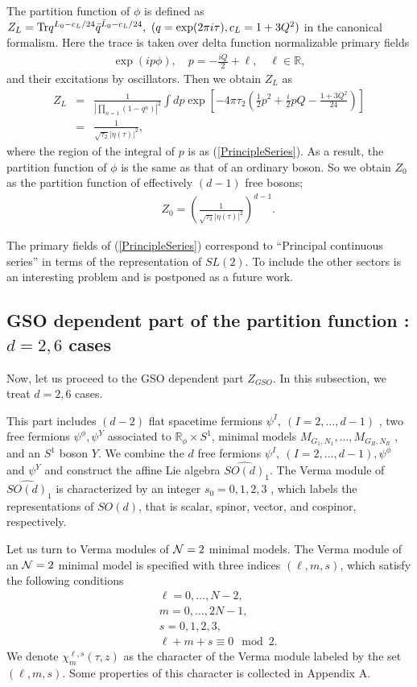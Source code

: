 \documentclass[a4paper,12pt]{article}
\numberwithin{equation}{section}
\newcommand{\Ncal}{{\cal N}}
\newcommand{\Rb}{{\mathbb R}}
\newcommand{\nn}{\nonumber}
\newcommand{\Tr}{{\rm Tr}}
\begin{document}
The partition function of $\phi$ is defined as
$Z_L=\Tr q^{L_0-c_L/24}\bar q^{\bar L_0-c_L/24},
\ (q=\exp(2\pi i\tau),c_L=1+3Q^2)$ in the canonical formalism.
Here the trace is taken over delta function normalizable
primary fields
\begin{eqnarray}
 \exp(ip\phi), \quad p=-\frac{iQ}{2}+\ell, \quad \ell\in \Rb,
\label{PrincipleSeries}
\end{eqnarray}
and their excitations by oscillators. 
Then we obtain $Z_L$ as
\begin{eqnarray*}
 Z_{L}&=&\frac{1}{|\prod_{n=1}(1-q^n)|^2}\int dp
\exp\left[-4\pi\tau_2\left(\frac12 p^2+\frac i2 pQ-\frac{1+3Q^2}{24}\right)
\right]\\
&=& \frac{1}{\sqrt{\tau_2}|\eta(\tau)|^2},
\end{eqnarray*}
where the region of the integral of $p$ is as 
(\ref{PrincipleSeries}).
As a result, the partition function of $\phi$ is the same as that
of an ordinary boson. So we obtain $Z_0$ as the
partition function of effectively $(d-1)$ free bosons;
\begin{eqnarray*}
 && Z_0=\left(\frac{1}{\sqrt{\tau_2}|\eta(\tau)|^2}\right)^{d-1}.
\end{eqnarray*}

The primary fields of (\ref{PrincipleSeries})
correspond to ``Principal continuous series'' in terms 
of the representation
of $SL(2)$. To include the other sectors is an interesting problem
and is postponed as a future work.

\subsection{GSO dependent part of the partition function
: $d=2,6$ cases}

Now, let us proceed to the GSO dependent part $Z_{GSO}$. 
In this subsection, we treat $d=2,6$ cases.

This part includes $(d-2)$ flat 
spacetime fermions $\psi^{I},\ (I=2,\dots,d-1)$ 
, two free fermions $\psi^{\phi},\psi^{Y}$
associated to $\Rb_{\phi}\times S^1$, minimal models
$M_{G_1,N_1},\dots,M_{G_R,N_R}$ , and an $S^1$ boson $Y$. 
We combine the 
$d$ free fermions $\psi^{I},\ (I=2,\dots,d-1) ,\psi^{\phi}$ and 
$\psi^{Y}$
and construct the affine Lie algebra $\widehat{SO(d)}_{1}$. 
The Verma module of $\widehat{SO(d)}_{1}$
is characterized by an integer $s_0=0,1,2,3$ , which labels
the representations of $SO(d)$, that is scalar, spinor, vector, and cospinor,
respectively.

Let us turn to Verma modules of $\Ncal=2$ minimal models.
The Verma module of an $\Ncal=2$ minimal model
is specified with three indices $(\ell,m,s)$, which satisfy
the following conditions\cite{Gep88}
\begin{eqnarray}
 && \ell=0,\dots,N-2,\nn\\
 && m=0,\dots,2N-1,\nn\\
 && s=0,1,2,3,\nn\\
 && \ell+m+s\equiv 0 \mod 2. \label{EvenCondition}
\end{eqnarray}
We denote  $\chi^{\ell,s}_m(\tau,z)$ as the character
of the Verma module labeled by the set $(\ell,m,s)$.
Some properties of this character is collected in Appendix A.
\end{document}
